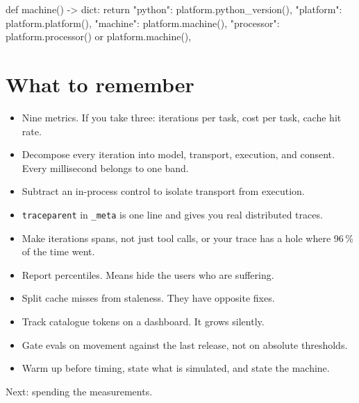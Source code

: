 \begin{py}
def machine() -> dict:
    return {
        "python": platform.python_version(),
        "platform": platform.platform(),
        "machine": platform.machine(),
        "processor": platform.processor() or platform.machine(),
    }
\end{py}

\section{What to remember}

\begin{itemize}[leftmargin=1.6em, itemsep=3pt]
\item Nine metrics. If you take three: iterations per task, cost per task, cache
hit rate.
\item Decompose every iteration into model, transport, execution, and consent.
Every millisecond belongs to one band.
\item Subtract an in-process control to isolate transport from execution.
\item \texttt{traceparent} in \texttt{\_meta} is one line and gives you real
distributed traces.
\item Make iterations spans, not just tool calls, or your trace has a hole where
96\,\% of the time went.
\item Report percentiles. Means hide the users who are suffering.
\item Split cache misses from staleness. They have opposite fixes.
\item Track catalogue tokens on a dashboard. It grows silently.
\item Gate evals on movement against the last release, not on absolute
thresholds.
\item Warm up before timing, state what is simulated, and state the machine.
\end{itemize}

Next: spending the measurements.
